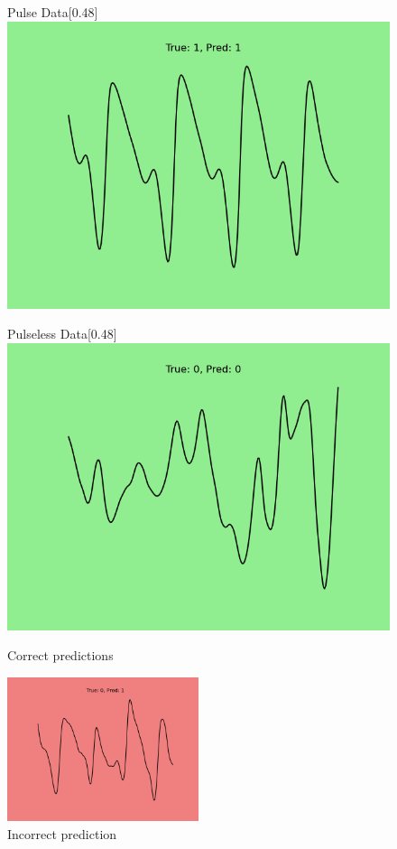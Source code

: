 \documentclass{article}
\begin{document}
\begin{figure}[H]
    \centering
    \begin{subcaptionbox}{Pulse Data\label{fig:image1}}[0.48\textwidth]
        {\includegraphics[width=\linewidth]{../media/pulse_1.png}}
    \end{subcaptionbox}
    \hfill
    \begin{subcaptionbox}{Pulseless Data\label{fig:image2}}[0.48\textwidth]
        {\includegraphics[width=\linewidth]{../media/no_pulse_1.png}}
    \end{subcaptionbox}
    \caption{Correct predictions}
    \label{fig:side_by_side}
\end{figure}

\begin{figure}[H]
    \centering
    \includegraphics[width=0.5\textwidth]{../media/wrong_2.png}
    \caption{Incorrect prediction}
    \label{fig:wrongo}
\end{figure}
\end{document}

